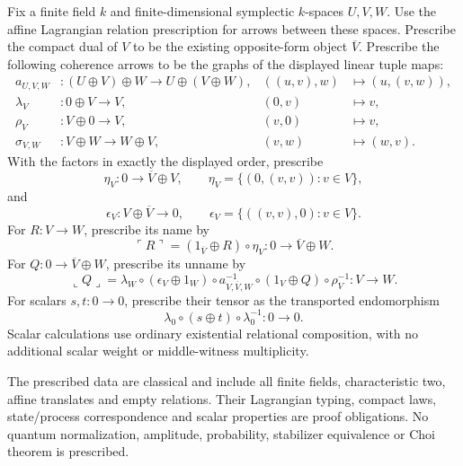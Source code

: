 \begin{definition}
Fix a finite field $k$ and finite-dimensional symplectic $k$-spaces $U,V,W$.
Use the affine Lagrangian relation prescription for arrows between these
spaces. Prescribe the compact dual of $V$ to be the existing
opposite-form object $\overline V$.  Prescribe the following coherence
arrows to be the graphs of the displayed linear tuple maps:
\[
\begin{aligned}
 a_{U,V,W}&:(U\oplus V)\oplus W\longrightarrow
 U\oplus(V\oplus W),& ((u,v),w)&\longmapsto(u,(v,w)),\\
 \lambda_V&:0\oplus V\longrightarrow V,&(0,v)&\longmapsto v,\\
 \rho_V&:V\oplus0\longrightarrow V,&(v,0)&\longmapsto v,\\
 \sigma_{V,W}&:V\oplus W\longrightarrow W\oplus V,&(v,w)&\longmapsto(w,v).
\end{aligned}
\]
With the factors in exactly the displayed order, prescribe
\[
 \eta_V:0\longrightarrow\overline V\oplus V,
 \qquad
 \eta_V=\{(0,(v,v)):v\in V\},
\]
and
\[
 \epsilon_V:V\oplus\overline V\longrightarrow0,
 \qquad
 \epsilon_V=\{((v,v),0):v\in V\}.
\]
For $R:V\to W$, prescribe its name by
\[
 \ulcorner R\urcorner
 =(1_{\overline V}\oplus R)\circ\eta_V:
 0\longrightarrow\overline V\oplus W.
\]
For $Q:0\to\overline V\oplus W$, prescribe its unname by
\[
 \llcorner Q\lrcorner
 =\lambda_W\circ(\epsilon_V\oplus1_W)
 \circ a^{-1}_{V,\overline V,W}\circ(1_V\oplus Q)
 \circ\rho_V^{-1}:V\longrightarrow W.
\]
For scalars $s,t:0\to0$, prescribe their tensor as the transported
endomorphism
\[
 \lambda_0\circ(s\oplus t)\circ\lambda_0^{-1}:0\longrightarrow0.
\]
Scalar calculations use ordinary existential relational composition, with
no additional scalar weight or middle-witness multiplicity.
\end{definition}
\begin{scope}
The prescribed data are classical and include all finite fields, characteristic two, affine translates and empty relations. Their Lagrangian typing, compact laws, state/process correspondence and scalar properties are proof obligations. No quantum normalization, amplitude, probability, stabilizer equivalence or Choi theorem is prescribed.
\end{scope}

